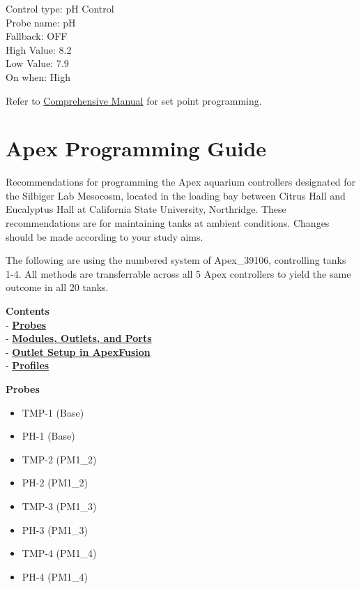 \documentclass[]{book}
\providecommand{\tightlist}{%
  \setlength{\itemsep}{0pt}\setlength{\parskip}{0pt}}
\begin{document}
Control type: pH Control\\
Probe name: pH\\
Fallback: OFF\\
High Value: 8.2\\
Low Value: 7.9\\
On when: High

Refer to
\href{https://github.com/SilbigerLab/Mesocosm_User_Manual/tree/7503b88686aef920c4a4ed473b1efe37b34dae10/Manuals/Apex_Comprehensive_Reference_Manual.pdf}{Comprehensive
Manual} for set point programming.

\chapter{Apex Programming Guide}\label{apex-programming-guide}

Recommendations for programming the Apex aquarium controllers designated
for the Silbiger Lab Mesocosm, located in the loading bay between Citrus
Hall and Eucalyptus Hall at California State University, Northridge.
These recommendations are for maintaining tanks at ambient conditions.
Changes should be made according to your study aims.

The following are using the numbered system of Apex\_39106, controlling
tanks 1-4. All methods are transferrable across all 5 Apex controllers
to yield the same outcome in all 20 tanks.

\textbf{Contents}\\
- \protect\hyperlink{Probes}{\textbf{Probes}}\\
- \protect\hyperlink{Modules_Outlets_and_Ports}{\textbf{Modules,
Outlets, and Ports}}\\
- \protect\hyperlink{Outlet_Setup}{\textbf{Outlet Setup in
ApexFusion}}\\
- \protect\hyperlink{Profiles}{\textbf{Profiles}}

 \textbf{Probes}

\begin{itemize}
\tightlist
\item
  TMP-1 (Base)
\item
  PH-1 (Base)
\item
  TMP-2 (PM1\_2)
\item
  PH-2 (PM1\_2)
\item
  TMP-3 (PM1\_3)
\item
  PH-3 (PM1\_3)
\item
  TMP-4 (PM1\_4)
\item
  PH-4 (PM1\_4)
\end{itemize}
\end{document}
